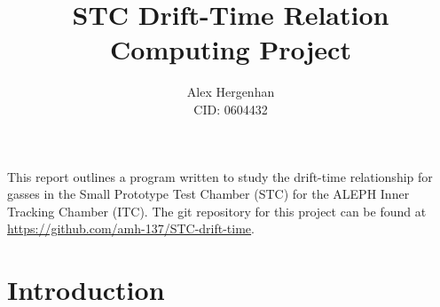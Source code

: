 \documentclass[11pt]{article}
\begin{document}
\title{STC Drift-Time Relation\\\normalsize Computing Project}
\author{Alex Hergenhan\\CID: 0604432}
\maketitle

This report outlines a program written to study the drift-time relationship for gasses in the Small Prototype Test Chamber (STC) for the ALEPH Inner Tracking Chamber (ITC). The git repository for this project can be found at \href{https://github.com/amh-137/STC-drift-time}{https://github.com/amh-137/STC-drift-time}.

\section{Introduction}
\label{sec:intro}
\end{document}
